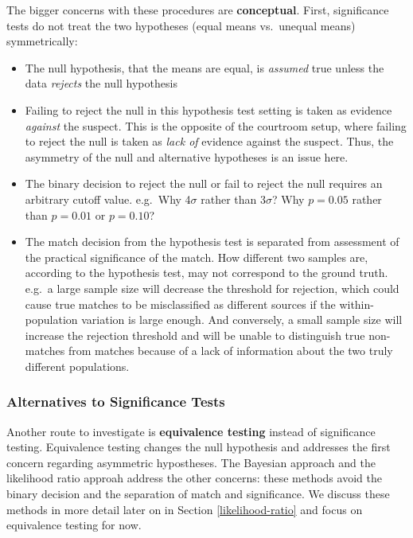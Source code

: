 \documentclass[]{book}
\providecommand{\tightlist}{%
  \setlength{\itemsep}{0pt}\setlength{\parskip}{0pt}}
\theoremstyle{definition}
\theoremstyle{definition}
\theoremstyle{remark}
\begin{document}
The bigger concerns with these procedures are \textbf{conceptual}.
First, significance tests do not treat the two hypotheses (equal means
vs.~unequal means) symmetrically:

\begin{itemize}
\tightlist
\item
  The null hypothesis, that the means are equal, is \emph{assumed} true
  unless the data \emph{rejects} the null hypothesis
\item
  Failing to reject the null in this hypothesis test setting is taken as
  evidence \emph{against} the suspect. This is the opposite of the
  courtroom setup, where failing to reject the null is taken as
  \emph{lack of} evidence against the suspect. Thus, the asymmetry of
  the null and alternative hypotheses is an issue here.
\item
  The binary decision to reject the null or fail to reject the null
  requires an arbitrary cutoff value. e.g.~Why 4\(\sigma\) rather than
  3\(\sigma\)? Why \(p = 0.05\) rather than \(p = 0.01\) or
  \(p = 0.10\)?
\item
  The match decision from the hypothesis test is separated from
  assessment of the practical significance of the match. How different
  two samples are, according to the hypothesis test, may not correspond
  to the ground truth. e.g.~a large sample size will decrease the
  threshold for rejection, which could cause true matches to be
  misclassified as different sources if the within-population variation
  is large enough. And conversely, a small sample size will increase the
  rejection threshold and will be unable to distinguish true non-matches
  from matches because of a lack of information about the two truly
  different populations. 
\end{itemize}

\subsubsection{Alternatives to Significance
Tests}\label{alternatives-to-significance-tests}

Another route to investigate is \textbf{equivalence testing} instead of
significance testing. Equivalence testing changes the null hypothesis
and addresses the first concern regarding asymmetric hypostheses. The
Bayesian approach and the likelihood ratio approah address the other
concerns: these methods avoid the binary decision and the separation of
match and significance. We discuss these methods in more detail later on
in Section \ref{likelihood-ratio} and focus on equivalence testing for
now.
\end{document}
